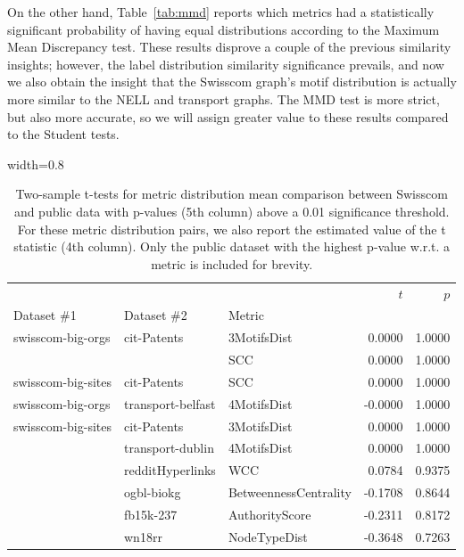 On the other hand, Table~\ref{tab:mmd} reports which metrics had a statistically significant probability of having equal distributions according to the Maximum Mean Discrepancy test. These results disprove a couple of the previous similarity insights; however, the label distribution similarity significance prevails, and now we also obtain the insight that the Swisscom graph's motif distribution is actually more similar to the NELL and transport graphs. The MMD test is more strict, but also more accurate, so we will assign greater value to these results compared to the Student tests.

\begin{table}[ht!]
    \centering
    \caption[Two-sample t-tests for metric distribution mean comparison between Swisscom and public data.]{Two-sample t-tests for metric distribution mean comparison between Swisscom and public data with p-values (5th column) above a 0.01 significance threshold. For these metric distribution pairs, we also report the estimated value of the t statistic (4th column). Only the public dataset with the highest p-value w.r.t. a metric is included for brevity.}
    \label{tab:t}
\begin{adjustbox}{width=0.8\columnwidth}
\begin{tabular}{lllrr}
\toprule
                   &                   &          &   $t$ &  $p$ \\
Dataset \#1 & Dataset \#2 & Metric &         &              \\
\midrule
swisscom-big-orgs & cit-Patents & 3MotifsDist &  0.0000 &       1.0000 \\
                   &                   & SCC &  0.0000 &       1.0000 \\
swisscom-big-sites & cit-Patents & SCC &  0.0000 &       1.0000 \\
swisscom-big-orgs & transport-belfast & 4MotifsDist & -0.0000 &       1.0000 \\
swisscom-big-sites & cit-Patents & 3MotifsDist &  0.0000 &       1.0000 \\
                   & transport-dublin & 4MotifsDist &  0.0000 &       1.0000 \\
                   & redditHyperlinks & WCC &  0.0784 &       0.9375 \\
                   & ogbl-biokg & BetweennessCentrality & -0.1708 &       0.8644 \\
                   & fb15k-237 & AuthorityScore & -0.2311 &       0.8172 \\
                   & wn18rr & NodeTypeDist & -0.3648 &       0.7263 \\

\end{tabular}
\end{adjustbox}
\end{table}
